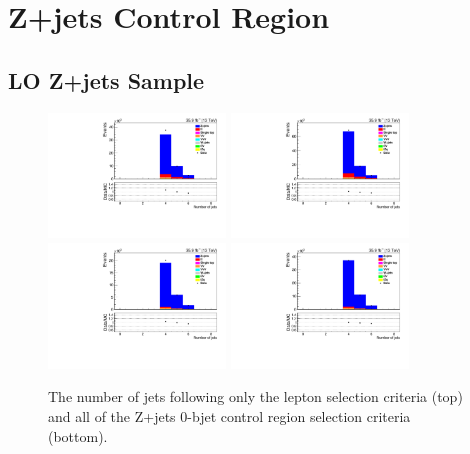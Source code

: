 \section{Z+jets Control Region}\label{appSec:zPlusControlRegionPlots}
\subsection{LO Z+jets Sample}

\begin{figure}[ht]
\centering
\includegraphics[width=0.42\textwidth]{figs/background-estimation/plots/unblinded/DY_control_old_prompt_ee_ttbarInc/numbJets_SingleTop_jetSel_ee.pdf}
\includegraphics[width=0.42\textwidth]{figs/background-estimation/plots/unblinded/DY_control_old_prompt_mumu_ttbarInc/numbJets_SingleTop_jetSel_mumu.pdf}
\\
\includegraphics[width=0.42\textwidth]{figs/background-estimation/plots/unblinded/DY_control_old_prompt_ee_ttbarInc/numbJets_SingleTop_wMass_ee.pdf}
\includegraphics[width=0.42\textwidth]{figs/background-estimation/plots/unblinded/DY_control_old_prompt_mumu_ttbarInc/numbJets_SingleTop_wMass_mumu.pdf}
\caption{
The number of jets following only the lepton selection criteria (top) and all of the Z+jets 0-bjet control region selection criteria (bottom).
}
\label{fig:App_CR_LO_nJets}
\end{figure}

